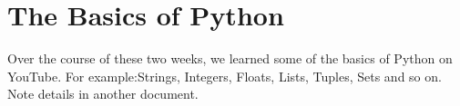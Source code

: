 \section{The Basics of Python}
Over the course of these two weeks, we learned some of the basics of Python on YouTube.
For example:Strings, Integers, Floats, Lists, Tuples, Sets and so on. Note details in another document.
